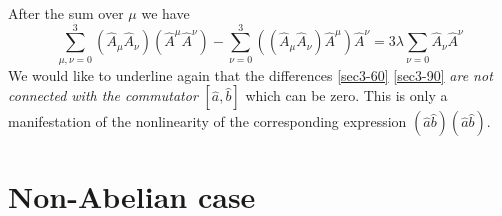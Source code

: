 \documentclass[a4paper,a4paper]{article}
\begin{document}
After the sum over $\mu$ we have 
\begin{equation}
  \sum^3_{\mu , \nu = 0} \left( 
  \hat{A}_\mu \hat{A}_\nu
  \right)
  \left( 
  \hat{A}^\mu \hat{A}^\nu
  \right ) - 
  \sum^3_{\nu = 0} \left( \left( \hat{A}_\mu \hat{A}_\nu 
  \right) \hat{A}^\mu \right ) \hat{A}^\nu = 
  3 \lambda \sum_{\nu = 0} \hat A_\nu \hat A^\nu 
\label{sec3-90}
\end{equation}
We would like to underline again that the differences \eqref{sec3-60} 
\eqref{sec3-90} 
\textit{are not connected with the commutator} $[\hat a , \hat b]$ 
which can be zero. This is only a manifestation of the nonlinearity 
of the corresponding expression 
$( \hat a \hat b ) ( \hat a \hat b )$. 

\section{Non-Abelian case}
\end{document}
